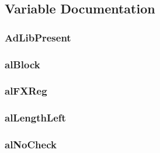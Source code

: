 \subsection{Variable Documentation}
\hypertarget{ID__SD_8C_aae5cf4d134b52966bc2aa3de22b0dd03}{
\subsubsection[{AdLibPresent}]{ {\bf AdLibPresent}}}
\label{ID__SD_8C_aae5cf4d134b52966bc2aa3de22b0dd03}
\hypertarget{ID__SD_8C_a9e81fc8ee3c094431e403b518cbf1875}{
\subsubsection[{alBlock}]{ {\bf alBlock}}}
\label{ID__SD_8C_a9e81fc8ee3c094431e403b518cbf1875}
\hypertarget{ID__SD_8C_af75a7f9861fb535b8d8ab10108148245}{
\subsubsection[{alFXReg}]{ {\bf alFXReg}}}
\label{ID__SD_8C_af75a7f9861fb535b8d8ab10108148245}
\hypertarget{ID__SD_8C_a00615a954b103b34a8699929b7311d1c}{
\subsubsection[{alLengthLeft}]{ {\bf alLengthLeft}}}
\label{ID__SD_8C_a00615a954b103b34a8699929b7311d1c}
\hypertarget{ID__SD_8C_a4a1e51753cfe2aea51d99cffbcd8eb80}{
\subsubsection[{alNoCheck}]{ {\bf alNoCheck}}}
